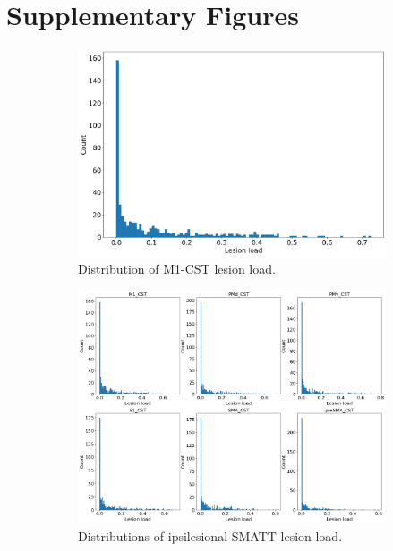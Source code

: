 \documentclass[10pt]{article}
\begin{document}
\section*{Supplementary Figures}
\begin{figure}
\begin{subfigure}{0.5\textwidth}
  \centering
  \includegraphics[width=1\linewidth]{figures/m1_lesionload.png}
  \caption{Distribution of M1-CST lesion load.}
  \label{fig:sfig1}
\end{subfigure}
\begin{subfigure}{0.5\textwidth}
  \centering
  \includegraphics[width=1\linewidth]{figures/all_lesionload.png}
  \caption{Distributions of ipsilesional SMATT lesion load.}
  \label{fig:sfig2}
\end{subfigure}
\begin{subfigure}{1\textwidth}

\end{subfigure}
\end{figure}
\end{document}
